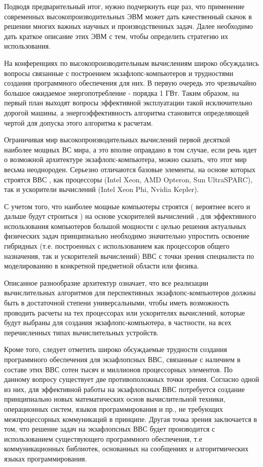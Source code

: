 Подводя предварительный итог, нужно подчеркнуть еще раз, что применение современных высокопроизводительных ЭВМ может дать качественный скачок в решении многих важных научных и производственных задач. Далее необходимо дать краткое описание этих ЭВМ с тем, чтобы определить стратегию их использования. 

На конференциях по высокопроизводительным вычислениям \cite{Abrau2011} широко обсуждались вопросы связанные с построением экзафлопс-компьютеров и трудностями создания программного обеспечения для них. 
В первую очередь это чрезвычайно большое ожидаемое энергопотребление - порядка 1 ГВт. Таким образом, на первый план выходят вопросы эффективной эксплуатации такой исключительно дорогой машины, а энергоэффективность алгоритма становится определяющей чертой для допуска этого алгоритма к расчетам.

Ограничивая мир высокопроизводительных вычислений первой десяткой наиболее мощных ВС мира, а это вполне оправдано в том случае, если речь идет о возможной архитектуре экзафлопс-компьютера,  можно сказать, что этот мир весьма неоднороден. Серьезно отличаются базовые элементы, на основе которых строятся ВВС , как процессоры (Intel Xeon, AMD Opteron, Sun UltraSPARC), так и ускорители вычислений (Intel Xeon Phi, Nvidia Kepler). 

С учетом того, что наиболее мощные компьютеры строятся ( вероятнее всего и дальше будут строиться \cite{Lu2015}) на основе ускорителей вычислений \cite{Stepanenko2010}, для эффективного использования компьютеров большой мощности с целью решения актуальных физических задач принципиально необходимо значительно упростить освоение гибридных (т.е. построенных с использованием как процессоров общего назначения, так и ускорителей вычислений) ВВС с точки зрения специалиста по моделированию в конкретной предметной области или физика. 

Описанное разнообразие архитектур означает, что все реализации вычислительных алгоритмов для перспективных экзафлопс-компьютеров должны быть в достаточной степени универсальными, чтобы иметь возможность проводить расчеты на тех процессорах или ускорителях вычислений, которые будут  выбраны для создания экзафлопс-компьютера, в частности, на всех перечисленных типах вычислительных устройств. 


Кроме того, следует отметить широко обсуждаемые трудности создания программного обеспечения для экзафлопсных ВВС, связанные с наличием в составе этих ВВС сотен тысяч и миллионов процессорных элементов. По данному вопросу существует две противоположных точки зрения. 
Согласно одной из них, для эффективной работы на экзафлопсных ВВС потребуется создание принципиально новых математических основ вычислительной техники, операционных систем, языков программирования и пр., не требующих межпроцессорных коммуникаций в принципе. Другая точка зрения заключается в том, что решение задач на экзафлопсных ВВС будет производится с использованием существующего программного обеспечения, т.е коммуникационных библиотек, основанных на сообщениях \cite{Gropp2009} и алгоритмических языках программирования. 


